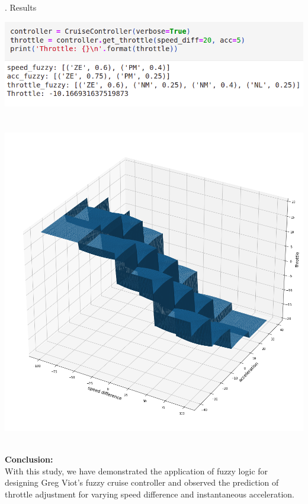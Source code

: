 \documentclass[a4paper, 12pt, fleqn]{article}
\begin{document}
\noindent
{}. Results
\begin{center}
	\vspace{0.1cm}
	\includegraphics[scale=0.5]{throttle_prediction}
\end{center}

\newpage
\section*{}

\begin{center}
	\vspace{0.1cm}
	\includegraphics[scale=0.45]{throttle_graph}
\end{center}

\noindent
\\
\textbf{Conclusion:} \\
With this study, we have demonstrated the application of fuzzy logic for designing Greg Viot's fuzzy cruise controller and observed the prediction of throttle adjustment for varying speed difference and instantaneous acceleration. \\
\end{document}

